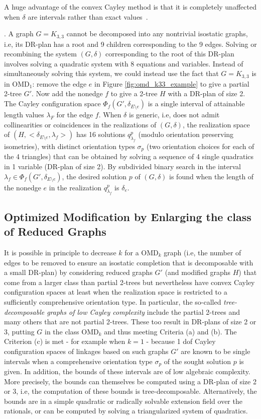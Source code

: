  A huge advantage of the convex Cayley method
is that it is completely unaffected when $\delta$ are intervals rather than exact values~\cite{GaoSitharam}.



\medskip{}.
A graph $G=K_{3,3}$  cannot be decomposed into any nontrivial isostatic
graphs, i.e, its DR-plan has a root and 9
children corresponding to the 9 edges. Solving or recombining the system
$(G,\delta)$
corresponding to the root of
this DR-plan involves solving a quadratic system with 8 equations and variables.
Instead of simultaneously solving this system, we could instead use the fact
that $G=K_{3,3}$ is in OMD$_1$: remove the
edge $e$ in Figure \ref{fig:omd_k33_example} to give a partial 2-tree $G'$.
Now add the nonedge $f$ to give a 2-tree $H$ with a DR-plan of size 2.
The Cayley configuration space $\Phi_f(G', \delta_{E\setminus e})$
is a single interval of attainable length values $\lambda_F$ for
the edge $f$.
When $\delta$ is generic, i.e, does not admit collinearities or coincidences
in the realizations of $(G,\delta)$,
the realization space of $(H, <\delta_{E\setminus e}, \lambda_f>)$ has 16
solutions $q^p_{\lambda_f}$ (modulo orientation preserving isometries),
with distinct orientation types $\sigma_p$ 
(two orientation choices for each of the 4 triangles)
that can be obtained by solving a sequence of 4 single quadratics in 1
variable (DR-plan of size 2).
By subdivided
binary search
in the interval $\lambda_f \in
\Phi_f(G', \delta_{E\setminus e})$, the desired
solution $p$  of $(G,\delta)$ is found when the length of the nonedge
$e$ in  the realization
$q^p_{\lambda_f}$
is $\delta_e$.
%
\subsection{Optimized Modification by Enlarging the class of Reduced
Graphs}
\label{tdecomp}
It is possible in principle to decrease $k$ for a OMD$_k$ graph
(i.e, the number of edges to be removed
to ensure an isostatic completion that is decomposable with a small DR-plan) by
considering reduced graphs $G'$ (and modified graphs $H$) that come from a larger class than
partial 2-trees but nevertheless have convex Cayley configuration spaces at
least when the realization space is restricted to a sufficiently
comprehensive orientation type.
In particular, the so-called {\em tree-decomposable graphs of low Cayley
complexity} \cite{XX} include the partial 2-trees and many others that are
not partial 2-trees. These too result in DR-plans of size 2 or 3, putting $G$ in the class
OMD$_k$ and thus meeting Criteria (a) and (b). The Criterion (c) is met
- for example when $k=1$ -  because 1 dof Cayley configuration spaces of
linkages based on such graphs $G'$
are known to be single intervals
when a comprehensive orientation type $\sigma_p$ of the sought solution $p$ is given.
In addition, the bounds of these intervals are of low algebraic
complexity.
More precisely, the bounds  can themselves be computed using a DR-plan of size 2 or 3,
i.e, the computation of these bounds is tree-decomposable. Alternatively,
the bounds are in a simple quadratic or radically solvable extension field over the rationals,
or can be computed by solving a
triangularized system of quadratics.
